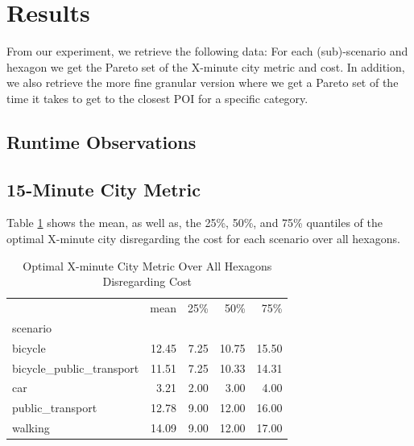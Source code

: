 \clearpage
\section{Results}
\label{sec:results}


From our experiment, we retrieve the following data:
For each (sub)-scenario and hexagon we get the Pareto set of the X-minute city metric and cost.
In addition, we also retrieve the more fine granular version where we get a Pareto set of the time it takes to get to the closest POI for a specific category.

\subsection{Runtime Observations}
\label{subsec:runtime_observations}

\subsection{15-Minute City Metric}
\label{subsec:15_minute_city_metric}

Table \ref{tab:optimal_x_minute_city_metric} shows the mean, as well as, the 25\%, 50\%, and 75\% quantiles of the optimal X-minute city disregarding the cost for each scenario over all hexagons.

\begin{table}
  \caption{Optimal X-minute City Metric Over All Hexagons Disregarding Cost}
  \label{tab:optimal_x_minute_city_metric}
  \begin{center}
    \begin{tabular}{lrrrr}
       & mean & 25\% & 50\% & 75\% \\
      scenario &  &  &  &  \\
      bicycle & 12.45 & 7.25 & 10.75 & 15.50 \\
      bicycle\_public\_transport & 11.51 & 7.25 & 10.33 & 14.31 \\
      car & 3.21 & 2.00 & 3.00 & 4.00 \\
      public\_transport & 12.78 & 9.00 & 12.00 & 16.00 \\
      walking & 14.09 & 9.00 & 12.00 & 17.00 \\
    \end{tabular}
  \end{center}
\end{table}

